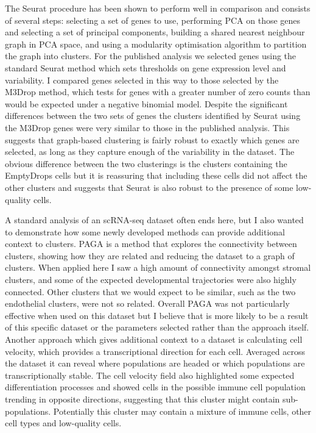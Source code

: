 \documentclass[11pt,a4paper,titlepage,twoside,openright]{style/unimelbthesis}
\theoremstyle{definition}
\theoremstyle{definition}
\theoremstyle{definition}
\theoremstyle{remark}
\begin{document}
\begin{mainmatter}
The Seurat procedure has been shown to perform well in comparison and consists of several steps: selecting a set of genes to use, performing PCA on those genes and selecting a set of principal components, building a shared nearest neighbour graph in PCA space, and using a modularity optimisation algorithm to partition the graph into clusters. For the published analysis we selected genes using the standard Seurat method which sets thresholds on gene expression level and variability. I compared genes selected in this way to those selected by the M3Drop method, which tests for genes with a greater number of zero counts than would be expected under a negative binomial model. Despite the significant differences between the two sets of genes the clusters identified by Seurat using the M3Drop genes were very similar to those in the published analysis. This suggests that graph-based clustering is fairly robust to exactly which genes are selected, as long as they capture enough of the variability in the dataset. The obvious difference between the two clusterings is the clusters containing the EmptyDrops cells but it is reassuring that including these cells did not affect the other clusters and suggests that Seurat is also robust to the presence of some low-quality cells.

A standard analysis of an scRNA-seq dataset often ends here, but I also wanted to demonstrate how some newly developed methods can provide additional context to clusters. PAGA is a method that explores the connectivity between clusters, showing how they are related and reducing the dataset to a graph of clusters. When applied here I saw a high amount of connectivity amongst stromal clusters, and some of the expected developmental trajectories were also highly connected. Other clusters that we would expect to be similar, such as the two endothelial clusters, were not so related. Overall PAGA was not particularly effective when used on this dataset but I believe that is more likely to be a result of this specific dataset or the parameters selected rather than the approach itself. Another approach which gives additional context to a dataset is calculating cell velocity, which provides a transcriptional direction for each cell. Averaged across the dataset it can reveal where populations are headed or which populations are transcriptionally stable. The cell velocity field also highlighted some expected differentiation processes and showed cells in the possible immune cell population trending in opposite directions, suggesting that this cluster might contain sub-populations. Potentially this cluster may contain a mixture of immune cells, other cell types and low-quality cells.


\end{mainmatter}
\end{document}
